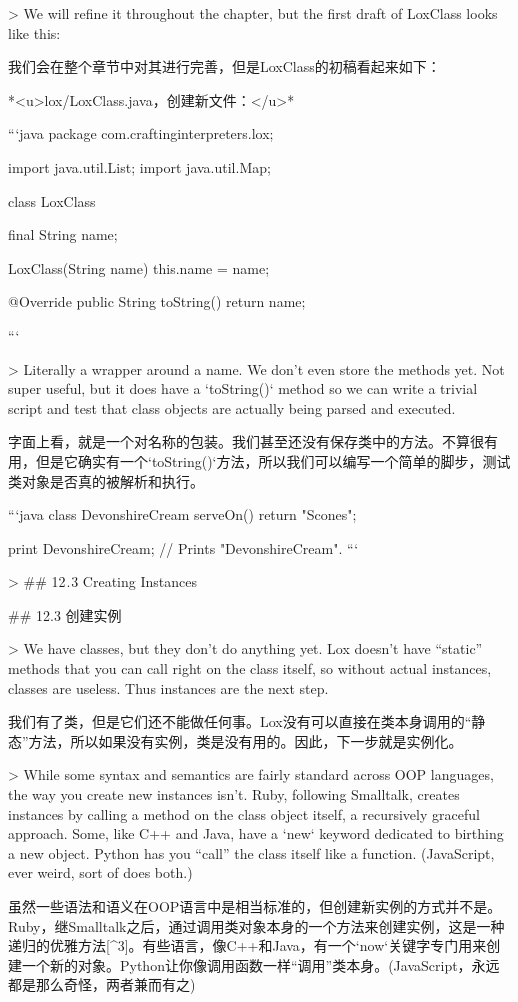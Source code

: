 \documentclass[cn,11pt,chinese]{elegantbook}
\begin{document}
{{{{{{{{{{{{{{{{{{{> We will refine it throughout the chapter, but the first draft of LoxClass looks like this:

我们会在整个章节中对其进行完善，但是LoxClass的初稿看起来如下：

*<u>lox/LoxClass.java，创建新文件：</u>*

```java
package com.craftinginterpreters.lox;

import java.util.List;
import java.util.Map;

class LoxClass {
  final String name;

  LoxClass(String name) {
    this.name = name;
  }

  @Override
  public String toString() {
    return name;
  }
}
```

> Literally a wrapper around a name. We don’t even store the methods yet. Not super useful, but it does have a `toString()` method so we can write a trivial script and test that class objects are actually being parsed and executed.

字面上看，就是一个对名称的包装。我们甚至还没有保存类中的方法。不算很有用，但是它确实有一个`toString()`方法，所以我们可以编写一个简单的脚步，测试类对象是否真的被解析和执行。

```java
class DevonshireCream {
  serveOn() {
    return "Scones";
  }
}

print DevonshireCream; // Prints "DevonshireCream".
```

> ## 12 . 3 Creating Instances

## 12.3 创建实例

> We have classes, but they don’t do anything yet. Lox doesn’t have “static” methods that you can call right on the class itself, so without actual instances, classes are useless. Thus instances are the next step.

我们有了类，但是它们还不能做任何事。Lox没有可以直接在类本身调用的“静态”方法，所以如果没有实例，类是没有用的。因此，下一步就是实例化。

> While some syntax and semantics are fairly standard across OOP languages, the way you create new instances isn’t. Ruby, following Smalltalk, creates instances by calling a method on the class object itself, a recursively graceful approach. Some, like C++ and Java, have a `new` keyword dedicated to birthing a new object. Python has you “call” the class itself like a function. (JavaScript, ever weird, sort of does both.)

虽然一些语法和语义在OOP语言中是相当标准的，但创建新实例的方式并不是。Ruby，继Smalltalk之后，通过调用类对象本身的一个方法来创建实例，这是一种递归的优雅方法[^3]。有些语言，像C++和Java，有一个`now`关键字专门用来创建一个新的对象。Python让你像调用函数一样“调用”类本身。(JavaScript，永远都是那么奇怪，两者兼而有之)

}}}}}}}}}}}}}}}}}}}
\end{document}
